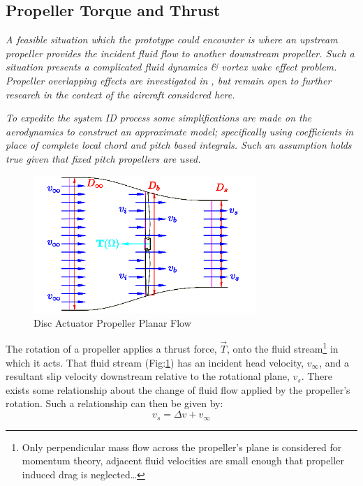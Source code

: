 \subsection{Propeller Torque and Thrust}
\label{subsec:dynamics.aero.bem}
\emph{\color{Gray} A feasible situation which the prototype could encounter is where an upstream propeller provides the incident fluid flow to another downstream propeller. Such a situation presents a complicated fluid dynamics \& vortex wake effect problem. Propeller overlapping effects are investigated in \cite{configurationpropulsion}, but remain open to further research in the context of the aircraft considered here.}
\par
\emph{\color{Gray}To expedite the system ID process some simplifications are made on the aerodynamics to construct an approximate model; specifically using coefficients in place of complete local chord and pitch based integrals. Such an assumption holds true given that fixed pitch propellers are used.}
\par
\begin{figure}[htbp]
\centering
\includegraphics[width=0.75\textwidth]{figs/bem-flow}
\caption{Disc Actuator Propeller Planar Flow}
\label{fig:bem-flow}
\end{figure}
The rotation of a propeller applies a thrust force, $\vec{T}$, onto the fluid stream\footnote{Only perpendicular mass flow across the propeller's plane is considered for momentum theory, adjacent fluid velocities are small enough that propeller induced drag is neglected\ldots} in which it acts. That fluid stream (Fig:\ref{fig:bem-flow}) has an incident head velocity, $v_\infty$, and a resultant slip velocity downstream relative to the rotational plane, $v_s$. There exists some relationship about the change of fluid flow applied by the propeller's rotation. Such a relationship can then be given by:
\begin{equation}
v_ s = \Delta v + v_\infty
\end{equation}
